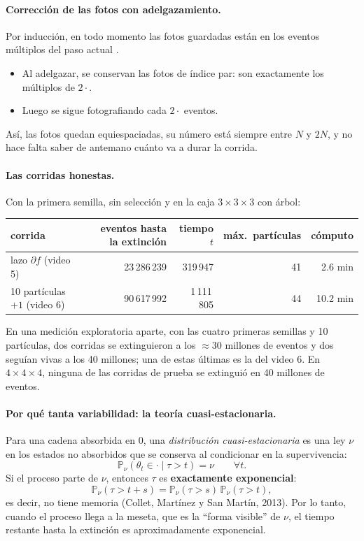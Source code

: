 \documentclass[11pt,a4paper]{article}
\theoremstyle{plain}
\theoremstyle{remark}
\newcommand{\fn}[1]{\texttt{\detokenize{#1}}}
\begin{document}
\paragraph{Corrección de las fotos con adelgazamiento.} Por inducción, en todo momento las fotos guardadas están en los eventos múltiplos del paso actual \fn{every}.
\begin{itemize}[nosep]
  \item Al adelgazar, se conservan las fotos de índice par: son exactamente los múltiplos de $2\cdot$\fn{every}.
  \item Luego se sigue fotografiando cada $2\cdot$\fn{every} eventos.
\end{itemize}
Así, las fotos quedan equiespaciadas, su número está siempre entre $N$ y $2N$, y no hace falta saber de antemano cuánto va a durar la corrida.

\paragraph{Las corridas honestas.} Con la primera semilla, sin selección y en la caja $3\times3\times3$ con árbol:

\begin{center}
\small
\begin{tabular}{@{}lrrrr@{}}
\toprule
corrida & eventos hasta la extinción & tiempo $t$ & máx.\ partículas & cómputo \\
\midrule
lazo $\partial f$ (video 5) & 23\,286\,239 & 319\,947 & 41 & 2.6 min \\
10 partículas $+1$ (video 6) & 90\,617\,992 & 1\,111\,805 & 44 & 10.2 min \\
\bottomrule
\end{tabular}
\end{center}

\noindent En una medición exploratoria aparte, con las cuatro primeras semillas y 10 partículas, dos corridas se extinguieron a los $\approx30$ millones de eventos y dos seguían vivas a los 40 millones; una de estas últimas es la del video 6. En $4\times4\times4$, ninguna de las corridas de prueba se extinguió en 40 millones de eventos.

\paragraph{Por qué tanta variabilidad: la teoría cuasi-estacionaria.} Para una cadena absorbida en $0$, una \emph{distribución cuasi-estacionaria} es una ley $\nu$ en los estados no absorbidos que se conserva al condicionar en la supervivencia:
\[
\mathbb{P}_\nu(\theta_t\in\cdot\mid\tau>t)=\nu\qquad\forall t .
\]
Si el proceso parte de $\nu$, entonces $\tau$ es \textbf{exactamente exponencial}:
\[
\mathbb{P}_\nu(\tau>t+s)=\mathbb{P}_\nu(\tau>s)\,\mathbb{P}_\nu(\tau>t),
\]
es decir, no tiene memoria (Collet, Martínez y San Martín, 2013). Por lo tanto, cuando el proceso llega a la meseta, que es la ``forma visible'' de $\nu$, el tiempo restante hasta la extinción es aproximadamente exponencial.
\end{document}
